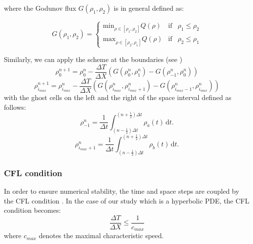 \documentclass[letterpaper,10pt]{article}
\begin{document}
\noindent where the Godunov flux $G(\rho_{1},\rho_{2})$ is in general defined as:

\begin{equation} \label{eq:rhoGodunovFluxGeneral}
G(\rho_{1},\rho_{2}) = \left\{ \begin{array}{lll}
\text{min}_{\rho \in [\rho_{1},\rho_{2}]} Q(\rho) & \text{if} & \rho_{1} \leq \rho_{2}\\
\text{max}_{\rho \in [\rho_{2},\rho_{1}]} Q(\rho) & \text{if} & \rho_{2} \leq \rho_{1}
\end{array}\right.
\end{equation}

Similarly, we can apply the  scheme at the boundaries (see \cite{Strub2006})
\begin{equation} \label{eq:rhoGodunovleft}
\rho^{n+1}_{0} = \rho^{n}_{0} - \frac{\Delta T}{\Delta X}\left(G(\rho^{n}_{0},\rho^{n}_{1})-G(\rho^{n}_{-1},\rho^{n}_{0})\right)
\end{equation}
\begin{equation} \label{eq:rhoGodunovright}
\rho^{n+1}_{i_{max}} = \rho^{n}_{i_{max}} - \frac{\Delta T}{\Delta X}\left(G(\rho^{n}_{{i_{max}}},\rho^{n}_{{i_{max}}+1})-G(\rho^{n}_{{i_{max}}-1},\rho^{n}_{{i_{max}}})\right)
\end{equation}
\noindent with the ghost cells on the left and the right of the space interval defined as follows:
\begin{equation} \label{eq:ghostleft}
\rho^{n}_{-1} = \frac{1}{\Delta t}\int_{(n-\frac{1}{2})\Delta t}^{(n+\frac{1}{2})\Delta t} \! \rho_{a}(t) \, \mathrm{d} t.
\end{equation}
\begin{equation} \label{eq:ghostright}
\rho^{n}_{i_{max}+1} = \frac{1}{\Delta t}\int_{(n-\frac{1}{2})\Delta t}^{(n+\frac{1}{2})\Delta t} \! \rho_{b}(t) \, \mathrm{d} t.
\end{equation}
\subsubsection{CFL condition}\label{cfl}

In order to ensure numerical stability, the time and space steps are coupled by the CFL condition \cite{LeVeque1992}. In the case of our study which is a hyperbolic PDE, the CFL condition becomes:
\begin{equation}\label{eq:cfl}
\frac{\Delta T}{\Delta X} \leq \frac{1}{c_{max}}
\end{equation} 
\noindent where $c_{max}$ denotes the maximal characteristic speed.
\end{document}
